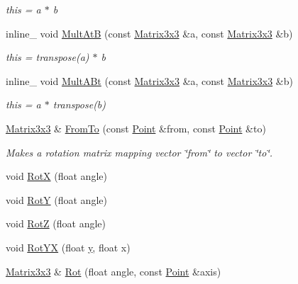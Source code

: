 \begin{DoxyCompactItemize}
\begin{DoxyCompactList}\small\item\em this = a $\ast$ b \end{DoxyCompactList}\item 
\hypertarget{class_matrix3x3_acaaf066874db7aecf219c362a9029de6}{inline\+\_\+ void \hyperlink{class_matrix3x3_acaaf066874db7aecf219c362a9029de6}{Mult\+At\+B} (const \hyperlink{class_matrix3x3}{Matrix3x3} \&a, const \hyperlink{class_matrix3x3}{Matrix3x3} \&b)}\label{class_matrix3x3_acaaf066874db7aecf219c362a9029de6}

\begin{DoxyCompactList}\small\item\em this = transpose(a) $\ast$ b \end{DoxyCompactList}\item 
\hypertarget{class_matrix3x3_a4df37cc8e30c8eb512c9645ea3446823}{inline\+\_\+ void \hyperlink{class_matrix3x3_a4df37cc8e30c8eb512c9645ea3446823}{Mult\+A\+Bt} (const \hyperlink{class_matrix3x3}{Matrix3x3} \&a, const \hyperlink{class_matrix3x3}{Matrix3x3} \&b)}\label{class_matrix3x3_a4df37cc8e30c8eb512c9645ea3446823}

\begin{DoxyCompactList}\small\item\em this = a $\ast$ transpose(b) \end{DoxyCompactList}\item 
\hypertarget{class_matrix3x3_aa2420e6446d215b6146fe6c09563fdf0}{\hyperlink{class_matrix3x3}{Matrix3x3} \& \hyperlink{class_matrix3x3_aa2420e6446d215b6146fe6c09563fdf0}{From\+To} (const \hyperlink{class_point}{Point} \&from, const \hyperlink{class_point}{Point} \&to)}\label{class_matrix3x3_aa2420e6446d215b6146fe6c09563fdf0}

\begin{DoxyCompactList}\small\item\em Makes a rotation matrix mapping vector \char`\"{}from\char`\"{} to vector \char`\"{}to\char`\"{}. \end{DoxyCompactList}\item 
void \hyperlink{class_matrix3x3_a2085f5fbfdc084bad6ec574e2efaec9c}{Rot\+X} (float angle)
\item 
void \hyperlink{class_matrix3x3_a042b69c07653ba64a03a32f0912e16b3}{Rot\+Y} (float angle)
\item 
void \hyperlink{class_matrix3x3_ac95efa91905c221156b7b2ab58b946b8}{Rot\+Z} (float angle)
\item 
void \hyperlink{class_matrix3x3_a7c4719756d1d0b58286f50258b645438}{Rot\+Y\+X} (float \hyperlink{_ice_utils_8h_aa7ffaed69623192258fb8679569ff9ba}{y}, float x)
\item 
\hypertarget{class_matrix3x3_a945f9b8cc98fa3e2156acd531262c37b}{\hyperlink{class_matrix3x3}{Matrix3x3} \& \hyperlink{class_matrix3x3_a945f9b8cc98fa3e2156acd531262c37b}{Rot} (float angle, const \hyperlink{class_point}{Point} \&axis)}\label{class_matrix3x3_a945f9b8cc98fa3e2156acd531262c37b}


\end{DoxyCompactItemize}
